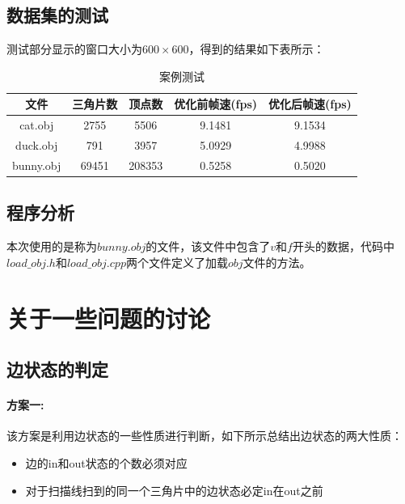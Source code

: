 \documentclass[10pt]{article}
\begin{document}
\subsection{数据集的测试}
测试部分显示的窗口大小为$600\times600$，得到的结果如下表所示：
\begin{table}[H]
\caption{案例测试}
\begin{center}
\begin{tabular}{ccccc}
\toprule  %
文件&三角片数&顶点数&优化前帧速(fps)&优化后帧速(fps)\\
\midrule  %
cat.obj&2755&5506&9.1481& 9.1534\\
duck.obj&791&3957& 5.0929&4.9988\\
bunny.obj&69451&208353&0.5258&0.5020\\
\bottomrule %
\end{tabular}
\end{center}
\end{table}

\subsection{程序分析}
本次使用的是称为$bunny.obj$的文件，该文件中包含了$v$和$f$开头的数据，代码中$load\_obj.h$和$load\_obj.cpp$两个文件定义了加载$obj$文件的方法。

\section{关于一些问题的讨论}
\subsection{边状态的判定}
\paragraph{方案一:}
该方案是利用边状态的一些性质进行判断，如下所示总结出边状态的两大性质：
\begin{itemize}
\item{边的in和out状态的个数必须对应}
\item{对于扫描线扫到的同一个三角片中的边状态必定in在out之前}
\end{itemize}
\end{document}
